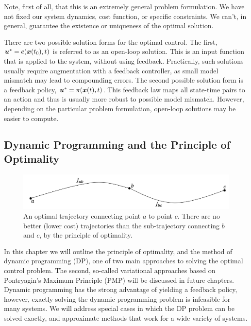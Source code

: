 Note, first of all, that this is an extremely general problem formulation. We have not fixed our system dynamics, cost function, or specific constraints. We can't, in general, guarantee the existence or uniqueness of the optimal solution. 

There are two possible solution forms for the optimal control. The first, $\bm{u}^* = e(\bm{x}(t_0),t)$ is referred to as an open-loop solution. This is an input function that is applied to the system, without using feedback. Practically, such solutions usually require augmentation with a feedback controller, as small model mismatch may lead to compounding errors. The second possible solution form is a feedback policy, $\bm{u}^* = \pi(\bm{x}(t),t)$. This feedback law maps all state-time pairs to an action and thus is usually more robust to possible model mismatch. However, depending on the particular problem formulation, open-loop solutions may be easier to compute. 

\subsection{Dynamic Programming and the Principle of Optimality}


\begin{figure}[t]
    \centering
    \includegraphics[width=0.8\linewidth]{figs/optimality.png}
    \caption{An optimal trajectory connecting point $a$ to point $c$. There are no better (lower cost) trajectories than the sub-trajectory connecting $b$ and $c$, by the principle of optimality.}
    \label{fig:opt1}
\end{figure}

In this chapter we will outline the principle of optimality, and the method of dynamic programming (DP), one of two main approaches to solving the optimal control problem. The second, so-called variational approaches based on Pontryagin's Maximum Principle (PMP) will be discussed in future chapters. Dynamic programming has the strong advantage of yielding a feedback policy, however, exactly solving the dynamic programming problem is infeasible for many systems. We will address special cases in which the DP problem can be solved exactly, and approximate methods that work for a wide variety of systems. 

